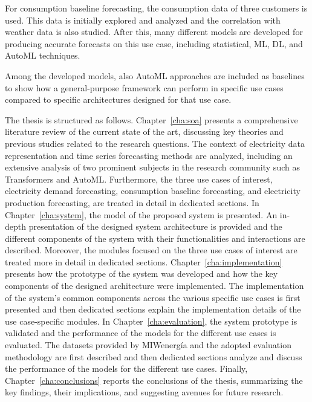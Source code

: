 For consumption baseline forecasting, the consumption data of three customers is used.
This data is initially explored and analyzed and the correlation with weather data is also studied.
After this, many different models are developed for producing accurate forecasts on this use case, including statistical, ML, DL, and AutoML techniques.

Among the developed models, also AutoML approaches are included as baselines to show how a general-purpose framework can perform in specific use cases compared to specific architectures designed for that use case.



The thesis is structured as follows. 
Chapter~\ref{cha:soa} presents a comprehensive literature review of the current state of the art, discussing key theories and previous studies related to the research questions.
The context of electricity data representation and time series forecasting methods are analyzed, including an extensive analysis of two prominent subjects in the research community such as Transformers and AutoML.
Furthermore, the three use cases of interest, electricity demand forecasting, consumption baseline forecasting, and electricity production forecasting, are treated in detail in dedicated sections.
In Chapter~\ref{cha:system}, the model of the proposed system is presented.
An in-depth presentation of the designed system architecture is provided and the different components of the system with their functionalities and interactions are described.
Moreover, the modules focused on the three use cases of interest are treated more in detail in dedicated sections.
Chapter~\ref{cha:implementation} presents how the prototype of the system was developed and how the key components of the designed architecture were implemented.
The implementation of the system’s common components across the various specific use cases is first presented and then dedicated sections explain the implementation details of the use case-specific modules.
In Chapter~\ref{cha:evaluation}, the system prototype is validated and the performance of the models for the different use cases is evaluated.
The datasets provided by MIWenergía and the adopted evaluation methodology are first described and then dedicated sections analyze and discuss the performance of the models for the different use cases.
Finally, Chapter~\ref{cha:conclusions} reports the conclusions of the thesis, summarizing the key findings, their implications, and suggesting avenues for future research.
